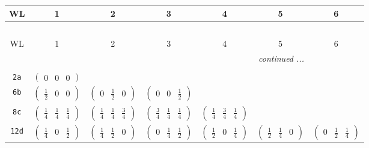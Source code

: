 \documentclass[fleqn,9pt,landscape]{jsarticle}
\begin{document}
\begin{center}
\renewcommand{\arraystretch}{1.2}
\begin{longtable}{ccccccc}
 \hline \hline
WL & 1 & 2 & 3 & 4 & 5 & 6 \\ \hline \endfirsthead

\multicolumn{6}{l}{\tablename\ \thetable{}} \\
 \hline \hline
WL & 1 & 2 & 3 & 4 & 5 & 6 \\ \hline \endhead

 \hline \hline
\multicolumn{6}{r}{\footnotesize\it continued ...} \\ \endfoot

 \hline \hline
\multicolumn{6}{r}{} \\ \endlastfoot

{\tt 2a} & $ \begin{pmatrix} 0 & 0 & 0 \end{pmatrix} $ & $  $ & $  $ & $  $ & $  $ & $  $ \\ \hline
{\tt 6b} & $ \begin{pmatrix} \frac{1}{2} & 0 & 0 \end{pmatrix} $ & $ \begin{pmatrix} 0 & \frac{1}{2} & 0 \end{pmatrix} $ & $ \begin{pmatrix} 0 & 0 & \frac{1}{2} \end{pmatrix} $ & $  $ & $  $ & $  $ \\ \hline
{\tt 8c} & $ \begin{pmatrix} \frac{1}{4} & \frac{1}{4} & \frac{1}{4} \end{pmatrix} $ & $ \begin{pmatrix} \frac{1}{4} & \frac{1}{4} & \frac{3}{4} \end{pmatrix} $ & $ \begin{pmatrix} \frac{3}{4} & \frac{1}{4} & \frac{1}{4} \end{pmatrix} $ & $ \begin{pmatrix} \frac{1}{4} & \frac{3}{4} & \frac{1}{4} \end{pmatrix} $ & $  $ & $  $ \\ \hline
{\tt 12d} & $ \begin{pmatrix} \frac{1}{4} & 0 & \frac{1}{2} \end{pmatrix} $ & $ \begin{pmatrix} \frac{1}{4} & \frac{1}{2} & 0 \end{pmatrix} $ & $ \begin{pmatrix} 0 & \frac{1}{4} & \frac{1}{2} \end{pmatrix} $ & $ \begin{pmatrix} \frac{1}{2} & 0 & \frac{1}{4} \end{pmatrix} $ & $ \begin{pmatrix} \frac{1}{2} & \frac{1}{4} & 0 \end{pmatrix} $ & $ \begin{pmatrix} 0 & \frac{1}{2} & \frac{1}{4} \end{pmatrix} $ \\ \hline

\end{longtable}
\end{center}
\end{document}
